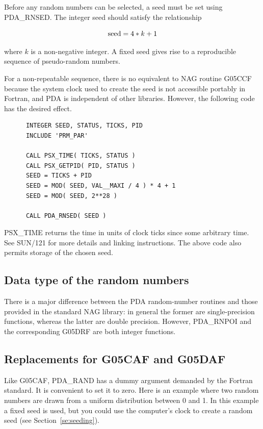 \documentclass[11pt,twoside]{article}
\newcommand{\xref}[3]{#1}
\newcommand{\xlabel}[1]{}
\begin{document}
   Before any random numbers can be selected, a seed must be set
   using PDA\_RNSED.  The integer seed should satisfy the relationship

   \[ {\rm seed} = 4 * k + 1 \]

   where $k$ is a non-negative integer.  A fixed seed gives rise to a
   reproducible sequence of pseudo-random numbers.

   For a non-repeatable sequence, there is no equivalent to NAG
   routine G05CCF because the system clock used to create the seed is
   not accessible portably in Fortran, and PDA is independent of other
   libraries.  However, the following code has the desired effect.

\begin{verbatim}
      INTEGER SEED, STATUS, TICKS, PID
      INCLUDE 'PRM_PAR'

      CALL PSX_TIME( TICKS, STATUS )
      CALL PSX_GETPID( PID, STATUS )
      SEED = TICKS + PID
      SEED = MOD( SEED, VAL__MAXI / 4 ) * 4 + 1
      SEED = MOD( SEED, 2**28 )

      CALL PDA_RNSED( SEED )
\end{verbatim}

   PSX\_TIME returns the time in units of clock ticks since some
   arbitrary time.  See \xref{SUN/121}{sun121}{} for more details and
   linking instructions.  The above code also permits storage of
   the chosen seed.

\subsection{\xlabel{data_type_of_the_random_numbers}Data type of the random numbers}

   There is a major difference between the PDA random-number routines
   and those provided in the standard NAG library: in general the
   former are single-precision functions, whereas the latter are
   double precision.  However, PDA\_RNPOI and the corresponding G05DRF
   are both integer functions.

\subsection{\xlabel{replacements_for_g05caf_and_g05daf}Replacements for G05CAF and G05DAF}

   Like G05CAF, PDA\_RAND has a dummy argument demanded by the Fortran
   standard.  It is convenient to set it to zero.  Here is an example
   where two random numbers are drawn from a uniform distribution
   between 0 and 1.  In this example a fixed seed is used, but you
   could use the computer's clock to create a random seed (see
   Section~\ref{se:seeding}).
\end{document}
